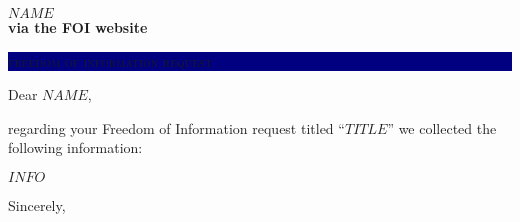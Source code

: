 \documentclass[11pt]{letter} %
\begin{document}


\begin{letter}{\large \bfseries $NAME$ \\ via the FOI website} %


\colorbox{Navy}{ %

\parbox[t]{\linewidth}{ %

\vspace*{14pt} %

\hfill \color{white} \textsc{\huge freedom of information request} %

\vspace*{14pt} %
}}


\signature{
John Smith \\ %
\textbf{FOI Manager} \\ %
}


\opening{Dear $NAME$,}

regarding your Freedom of Information request titled ``$TITLE$'' we collected the following information:

$INFO$

\closing{Sincerely,}


\end{letter}
\end{document}
